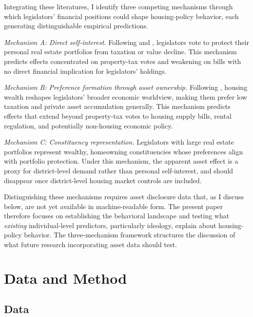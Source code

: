 \documentclass[11pt]{article}
\begin{document}
Integrating these literatures, I identify three competing mechanisms through which legislators' financial positions could shape housing-policy behavior, each generating distinguishable empirical predictions.

\textit{Mechanism A: Direct self-interest.} Following \citet{rosenson2003} and \citet{tahoun2014}, legislators vote to protect their personal real estate portfolios from taxation or value decline. This mechanism predicts effects concentrated on property-tax votes and weakening on bills with no direct financial implication for legislators' holdings.

\textit{Mechanism B: Preference formation through asset ownership.} Following \citet{ansell2014}, housing wealth reshapes legislators' broader economic worldview, making them prefer low taxation and private asset accumulation generally. This mechanism predicts effects that extend beyond property-tax votes to housing supply bills, rental regulation, and potentially non-housing economic policy.

\textit{Mechanism C: Constituency representation.} Legislators with large real estate portfolios represent wealthy, homeowning constituencies whose preferences align with portfolio protection. Under this mechanism, the apparent asset effect is a proxy for district-level demand rather than personal self-interest, and should disappear once district-level housing market controls are included.

Distinguishing these mechanisms requires asset disclosure data that, as I discuss below, are not yet available in machine-readable form. The present paper therefore focuses on establishing the behavioral landscape and testing what \textit{existing} individual-level predictors, particularly ideology, explain about housing-policy behavior. The three-mechanism framework structures the discussion of what future research incorporating asset data should test.


\section{Data and Method}
\label{sec:data}

\subsection{Data}
\end{document}
